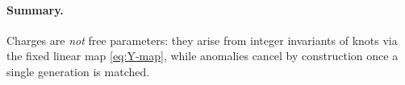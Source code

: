     \paragraph{Summary.}
    Charges are \emph{not} free parameters: they arise from integer invariants of knots via the fixed linear map \eqref{eq:Y-map}, while anomalies cancel by construction once a single generation is matched.